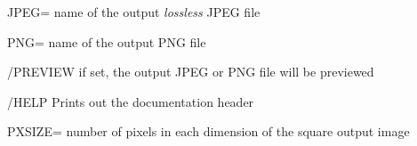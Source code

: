 \begin{keywords}
  \begin{kwlist}{} %

\item [{JPEG=}\mytarget{idl:hpx2dm:jpeg}] name of the output {\em lossless}
JPEG file
\item [{PNG=}\mytarget{idl:hpx2dm:png}]  name of the output PNG file

\item [{/PREVIEW}\mytarget{idl:hpx2dm:preview}] if set, the output JPEG or PNG
file will be previewed

\item [{/HELP}\mytarget{idl:hpx2dm:help}]  Prints out the documentation header 

\item [{PXSIZE=}\mytarget{idl:hpx2dm:pxsize}]  number of pixels in each
dimension of the square output image







\end{kwlist}
\end{keywords}
